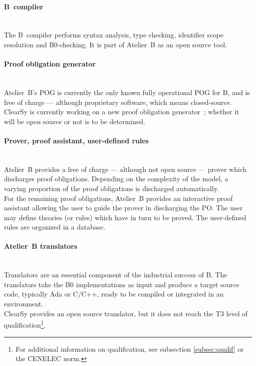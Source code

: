 \documentclass{article}
\begin{document}
\paragraph{B~compiler}~\\
The B~compiler performs syntax analysis, type checking, identifier scope resolution and B0-checking. It is part of Atelier~B as an open source tool.

\paragraph{Proof obligation generator}~\\
Atelier~B's POG is currently the only known fully operational POG for B, and is free of charge --- although proprietary software, which means closed-source. ClearSy is currently working on a new proof obligation generator~; whether it will be open source or not is to be determined.

\paragraph{Prover, proof assistant, user-defined rules}~\\
Atelier~B provides a free of charge --- although not open source --- prover which discharges proof obligations. Depending on the complexity of the model, a varying proportion of the proof obligations is discharged automatically.\\
For the remaining proof obligations, Atelier~B provides an interactive proof assistant allowing the user to guide the prover in discharging the PO. The user may define theories (or rules) which have in turn to be proved. The user-defined rules are organized in a database. 

\paragraph{Atelier~B translators}~\\
Translators are an essential component of the industrial success of B. The translators take the B0 implementations as input and produce a target source code, typically Ada or C/C++, ready to be compiled or integrated in an environment.\\
ClearSy provides an open source translator, but it does not reach the T3 level of qualification\footnote{For additional information on qualification, see subsection \ref{subsec:qualif} or the CENELEC norm.}.
\end{document}
